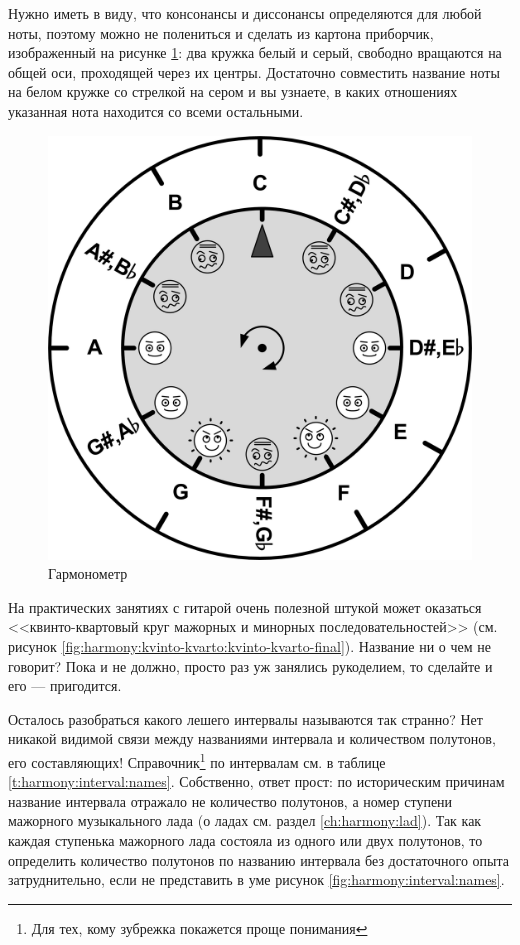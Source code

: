 Нужно иметь в виду, что консонансы и диссонансы определяются для любой ноты, поэтому можно не полениться и сделать из картона приборчик, изображенный на рисунке \ref{fig:harmony:interval:octave-kon-dis}: два кружка белый и серый, свободно вращаются на общей оси, проходящей через их центры. Достаточно совместить название ноты на белом кружке со стрелкой на сером и вы узнаете, в каких отношениях указанная нота находится со всеми остальными.

\begin{figure}[!ht]
    \centering
    \includegraphics[scale=0.7]{fig/intervals/octave-kon-dis} 
    \caption{Гармонометр}\label{fig:harmony:interval:octave-kon-dis}
\end{figure} 

На практических занятиях с гитарой очень полезной штукой может оказаться <<квинто-квартовый круг мажорных и минорных последовательностей>> (см. рисунок \ref{fig:harmony:kvinto-kvarto:kvinto-kvarto-final}). Название ни о чем не говорит? Пока и не должно, просто раз уж занялись рукоделием, то сделайте и его --- пригодится.

Осталось разобраться какого лешего интервалы называются так странно? Нет никакой видимой связи между названиями интервала и количеством полутонов, его составляющих! Справочник\footnote{Для тех, кому зубрежка покажется проще понимания} по интервалам см. в таблице \ref{t:harmony:interval:names}. Собственно, ответ прост: по историческим причинам название интервала отражало не количество полутонов, а номер ступени мажорного музыкального лада (о ладах см. раздел \ref{ch:harmony:lad}). Так как каждая ступенька мажорного лада состояла из одного или двух полутонов, то определить количество полутонов по названию интервала без достаточного опыта затруднительно, если не представить в уме рисунок \ref{fig:harmony:interval:names}.

